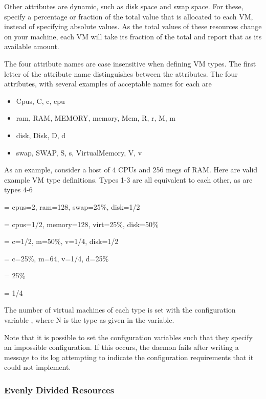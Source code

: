 Other attributes are dynamic, such as disk space and swap space.
For these, specify a percentage or fraction of the total
value that is allocated to each VM, instead of specifying absolute values.
As the total values of these resources change on your machine, each
VM will take its fraction of the total and report that as its
available amount.

The four attribute names are case insensitive when defining VM types.
The first letter of the attribute name distinguishes between
the attributes.
The four attributes, with several examples of acceptable names for
each are
\begin{itemize}
  \item Cpus, C, c, cpu 
  \item ram, RAM, MEMORY, memory, Mem, R, r, M, m
  \item disk, Disk, D, d
  \item swap, SWAP, S, s, VirtualMemory, V, v
\end{itemize}

As an example, consider a
host of 4 CPUs and 256 megs of RAM.
Here are valid example VM type definitions. 
Types 1-3 are all equivalent to each other, as are types 4-6

 = cpus=2, ram=128, swap=25\%, disk=1/2

 = cpus=1/2, memory=128, virt=25\%, disk=50\%

 = c=1/2, m=50\%, v=1/4, disk=1/2

 = c=25\%, m=64, v=1/4, d=25\%

 = 25\%

 = 1/4


The number of virtual machines of each type is set with the
configuration variable
,
where N is the type as given in the
variable.

Note that it is possible to set the configuration variables such
that they specify an impossible configuration.
If this occurs, the  daemon fails after writing
a message to its log attempting to indicate the configuration
requirements that it could not implement.

\subsubsection{\label{sec:Config-VM-Number}
Evenly Divided Resources}

